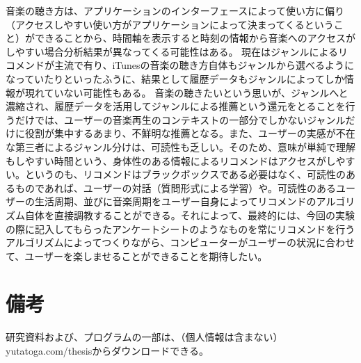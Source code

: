 \documentclass{jsarticle}
\begin{document}
音楽の聴き方は、アプリケーションのインターフェースによって使い方に偏り（アクセスしやすい使い方がアプリケーションによって決まってくるということ）ができることから、時間軸を表示すると時刻の情報から音楽へのアクセスがしやすい場合分析結果が異なってくる可能性はある。
現在はジャンルによるリコメンドが主流で有り、iTunesの音楽の聴き方自体もジャンルから選べるようになっていたりといったふうに、結果として履歴データもジャンルによってしか情報が現れていない可能性もある。
音楽の聴きたいという思いが、ジャンルへと濃縮され、履歴データを活用してジャンルによる推薦という還元をとることを行うだけでは、ユーザーの音楽再生のコンテキストの一部分でしかないジャンルだけに役割が集中するあまり、不鮮明な推薦となる。また、ユーザーの実感が不在な第三者によるジャンル分けは、可読性も乏しい。そのため、意味が単純で理解もしやすい時間という、身体性のある情報によるリコメンドはアクセスがしやすい。というのも、リコメンドはブラックボックスである必要はなく、可読性のあるものであれば、ユーザーの対話（質問形式による学習）や。可読性のあるユーザーの生活周期、並びに音楽周期をユーザー自身によってリコメンドのアルゴリズム自体を直接調教することができる。それによって、最終的には、今回の実験の際に記入してもらったアンケートシートのようなものを常にリコメンドを行うアルゴリズムによってつくりながら、コンピューターがユーザーの状況に合わせて、ユーザーを楽しませることができることを期待したい。

\section{備考}
研究資料および、プログラムの一部は、（個人情報は含まない）
yutatoga.com/thesisからダウンロードできる。
\end{document}
